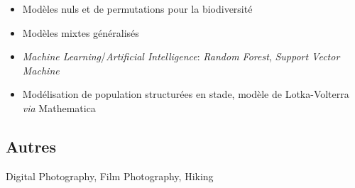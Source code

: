 \documentclass[10pt,a4paper,]{article}
\providecommand{\tightlist}{%
  \setlength{\itemsep}{0pt}\setlength{\parskip}{0pt}}
\begin{document}
\begin{itemize}
\tightlist
\item
  Modèles nuls et de permutations pour la biodiversité
\item
  Modèles mixtes généralisés
\item
  \emph{Machine Learning}/\emph{Artificial Intelligence}: \emph{Random
  Forest}, \emph{Support Vector Machine}
\item
  Modélisation de population structurées en stade, modèle de
  Lotka-Volterra \emph{via} Mathematica
\end{itemize}

\hypertarget{autres}{%
\subsection{Autres}\label{autres}}

Digital Photography, Film Photography, Hiking
\end{document}
